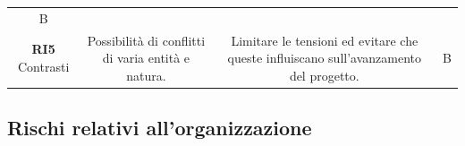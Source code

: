\begin{center}
\begin{longtable}{C{\colA} | C{\colB} | C{\colC} | C{\colD}}
B \\
\textbf{RI5} \newline Contrasti &

Possibilità di conflitti di varia entità e natura. & 

Limitare le tensioni ed evitare che queste influiscano sull'avanzamento del progetto.  & 

B \\

\end{longtable}
\end{center}

\subsection{Rischi relativi all'organizzazione}
